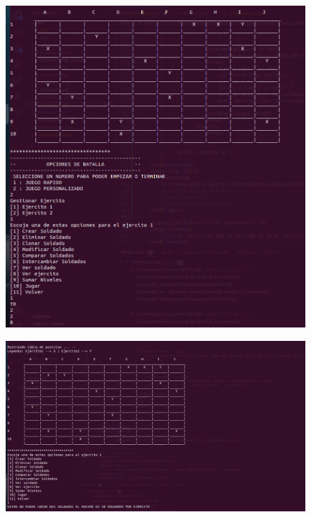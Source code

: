\documentclass{article}
\begin{document}
	\begin{figure}[H]
		\centering
		\includegraphics[width=1.0\textwidth,keepaspectratio]{img/Commit4.0.png}
	\end{figure}
	\begin{figure}[H]
		\centering
		\includegraphics[width=1.0\textwidth,keepaspectratio]{img/Commit4.1.png}
	\end{figure}
\end{document}
